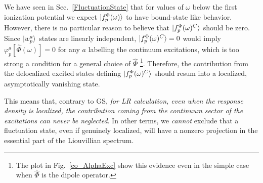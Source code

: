 \documentclass[reprint,aps,prb]{revtex4-1}
\newcommand{\op}[1]{\hat {#1}}
\newcommand{\fscd}[1]{\ket{f_p^\Phi(\omega)^{#1}}}
\begin{document}
We have seen in Sec.~\ref{FluctuationState} that 
for values of $\omega$ below the first ionization potential we expect
$\ket{f_p^\Phi(\omega)}$ to have bound-state like behavior.
However, there is no particular reason to believe that $\fscd{C}$ should be
zero. Since $\ket{w_p^a}$ states are linearly independent, 
$\fscd{C}=0$ would imply
$\varphi_p^a[\op \Phi(\omega)]=0$ for any $a$ labelling the continuum excitations,
which is too strong a condition for a general choice of $\op \Phi$
\footnote{The plot in Fig.~\ref{co_AlphaExc}
show this evidence even in the simple case when $\op \Phi$ is the dipole operator.}.
Therefore,  the contribution from the delocalized excited states defining
$\fscd{C}$ should resum into a localized, asymptotically vanishing state.

This means that, contrary to GS, \emph{for LR calculation,
even when the response density is localized, the contribution coming from the 
continuum sector of the excitations can never be neglected}. 
In other terms, we \emph{cannot} exclude that a fluctuation state, even if genuinely localized, will have a nonzero projection
in the essential part of the Liouvillian spectrum.
\end{document}
